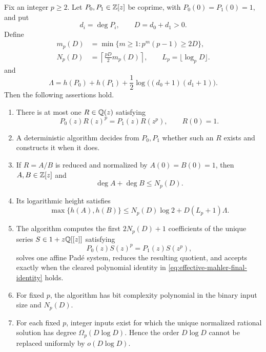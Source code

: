 \begin{theorem}
\label{thm:effective-rational-mahler-coboundary}
Fix an integer \(p\ge2\).  Let \(P_0,P_1\in\mathbb{Z}[z]\) be coprime, with
\(P_0(0)=P_1(0)=1\), and put
\[
 d_i=\deg P_i,\qquad D=d_0+d_1>0.
\]
Define
\begin{equation}\label{eq:effective-mahler-bounds}
 \begin{split}
 m_p(D)&=\min\{m\ge1:p^m(p-1)\ge2D\},\\
 N_p(D)&=\left\lceil\frac{pD}{2}m_p(D)\right\rceil,
 \qquad L_p=\lfloor\log_pD\rfloor.
 \end{split}
\end{equation}
and
\begin{equation}\label{eq:effective-mahler-height-bound}
 \Lambda=h(P_0)+h(P_1)
 +\frac12\log\bigl((d_0+1)(d_1+1)\bigr).
\end{equation}
Then the following assertions hold.
\begin{enumerate}[label=\textup{(\roman*)},leftmargin=*]
 \item There is at most one \(R\in\mathbb{Q}(z)\) satisfying
 \begin{equation}\label{eq:effective-mahler-equation}
  P_0(z)R(z)^p=P_1(z)R(z^p),\qquad R(0)=1.
 \end{equation}
 \item A deterministic algorithm decides from \(P_0,P_1\) whether such an
 \(R\) exists and constructs it when it does.
 \item If \(R=A/B\) is reduced and normalized by
 \(A(0)=B(0)=1\), then \(A,B\in\mathbb{Z}[z]\) and
 \begin{equation}\label{eq:effective-mahler-output-degree-bound}
  \deg A+\deg B\le N_p(D).
 \end{equation}
 \item Its logarithmic height satisfies
 \begin{equation}\label{eq:effective-mahler-output-bounds}
  \max\{h(A),h(B)\}
  \le N_p(D)\log2+D(L_p+1)\Lambda.
 \end{equation}
 \item The algorithm computes the first \(2N_p(D)+1\) coefficients of the
 unique series \(S\in1+z\mathbb{Q}[[z]]\) satisfying
 \begin{equation}\label{eq:effective-mahler-formal-equation}
  P_0(z)S(z)^p=P_1(z)S(z^p),
 \end{equation}
 solves one affine Pad\'e system, reduces the resulting quotient, and accepts
 exactly when the cleared polynomial identity in
 \eqref{eq:effective-mahler-final-identity} holds.
 \item For fixed \(p\), the algorithm has bit complexity polynomial in the
 binary input size and \(N_p(D)\).
 \item For each fixed \(p\), integer inputs exist for which the unique
 normalized rational solution has degree \(\Omega_p(D\log D)\).  Hence the
 order \(D\log D\) cannot be replaced uniformly by \(o(D\log D)\).
\end{enumerate}
\end{theorem}

